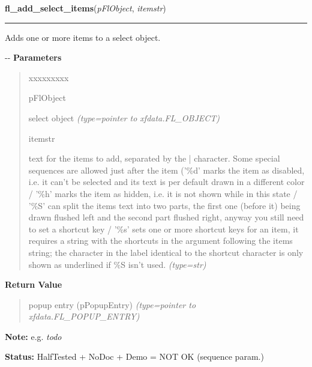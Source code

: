 \hspace{.8\funcindent}\begin{boxedminipage}{\funcwidth}

    \raggedright \textbf{fl\_add\_select\_items}(\textit{pFlObject}, \textit{itemstr})

    \vspace{-1.5ex}

    \rule{\textwidth}{0.5\fboxrule}
\setlength{\parskip}{2ex}

Adds one or more items to a select object.

-{}-
\setlength{\parskip}{1ex}
      \textbf{Parameters}
      \vspace{-1ex}

      \begin{quote}
        \begin{Ventry}{xxxxxxxxx}

          \item[pFlObject]


select object
            {\it (type=pointer to xfdata.FL\_OBJECT)}

          \item[itemstr]


text for the items to add, separated by the | character. Some special
sequences are allowed just after the item ('\%d' marks the item as
disabled, i.e. it can't be selected and its text is per default drawn
in a different color / '\%h' marks the item as hidden, i.e. it is not
shown while in this state / '\%S' can split the items text into two
parts, the first one (before it) being drawn flushed left and the
second part flushed right, anyway you still need to set a shortcut key
/ '\%s' sets one or more shortcut keys for an item, it requires a
string with the shortcuts in the argument following the items string;
the character in the label identical to the shortcut character is only
shown as underlined if \%S isn't used.
            {\it (type=str)}

        \end{Ventry}

      \end{quote}

      \textbf{Return Value}
    \vspace{-1ex}

      \begin{quote}

popup entry (pPopupEntry)
      {\it (type=pointer to xfdata.FL\_POPUP\_ENTRY)}

      \end{quote}

\textbf{Note:} 
e.g. \emph{todo}


\textbf{Status:} 
HalfTested + NoDoc + Demo = NOT OK (sequence param.)


    \end{boxedminipage}

